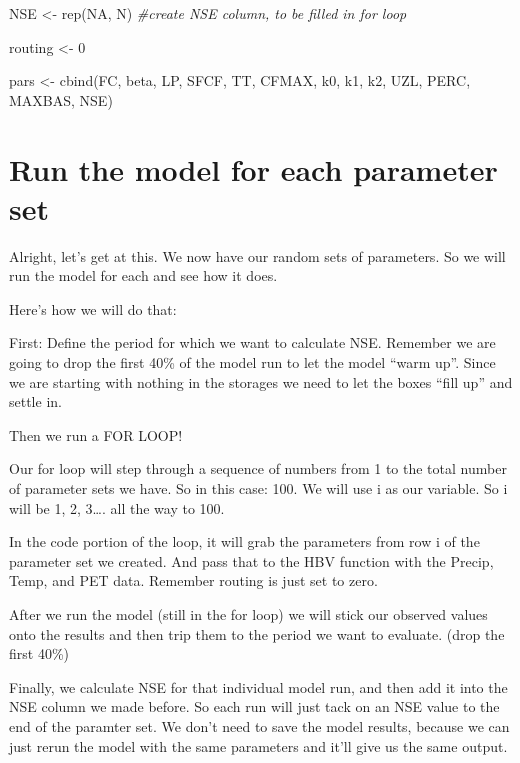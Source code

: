 \documentclass[
]{book}
\newenvironment{Shaded}{\begin{snugshade}}{\end{snugshade}}
\newcommand{\CommentTok}[1]{\textcolor[rgb]{0.56,0.35,0.01}{\textit{#1}}}
\newcommand{\ConstantTok}[1]{\textcolor[rgb]{0.00,0.00,0.00}{#1}}
\newcommand{\DecValTok}[1]{\textcolor[rgb]{0.00,0.00,0.81}{#1}}
\newcommand{\FunctionTok}[1]{\textcolor[rgb]{0.00,0.00,0.00}{#1}}
\newcommand{\NormalTok}[1]{#1}
\newcommand{\OtherTok}[1]{\textcolor[rgb]{0.56,0.35,0.01}{#1}}
\begin{document}
\begin{Shaded}
\begin{Highlighting}[]
\NormalTok{NSE }\OtherTok{\textless{}{-}} \FunctionTok{rep}\NormalTok{(}\ConstantTok{NA}\NormalTok{, N) }\CommentTok{\#create NSE column, to be filled in for loop}

\NormalTok{routing }\OtherTok{\textless{}{-}} \DecValTok{0}

\NormalTok{pars }\OtherTok{\textless{}{-}} \FunctionTok{cbind}\NormalTok{(FC, beta, LP, SFCF, }
\NormalTok{               TT, CFMAX, k0, k1, }
\NormalTok{               k2, UZL, PERC, MAXBAS, NSE) }
\end{Highlighting}
\end{Shaded}

\hypertarget{run-the-model-for-each-parameter-set}{%
\section{Run the model for each parameter set}\label{run-the-model-for-each-parameter-set}}

Alright, let's get at this. We now have our random sets of parameters. So we will run the model for each and see how it does.

Here's how we will do that:

First: Define the period for which we want to calculate NSE. Remember we are going to drop the first 40\% of the model run to let the model ``warm up''. Since we are starting with nothing in the storages we need to let the boxes
``fill up'' and settle in.

Then we run a FOR LOOP!

Our for loop will step through a sequence of numbers from 1 to the total number of parameter sets we have. So in this case: 100. We will use i as our variable. So i will be 1, 2, 3\ldots. all the way to 100.

In the code portion of the loop, it will grab the parameters from row i of the parameter set we created. And pass that to the HBV function with the Precip, Temp, and PET data. Remember routing is just set to zero.

After we run the model (still in the for loop) we will stick our observed values onto the results and then trip them to the period we want to evaluate. (drop the first 40\%)

Finally, we calculate NSE for that individual model run, and then add it into the NSE column we made before. So each run will just tack on an NSE value to the end of the paramter set. We don't need to save the model results, because we can just rerun the model with the same parameters and it'll give us the same output.
\end{document}
